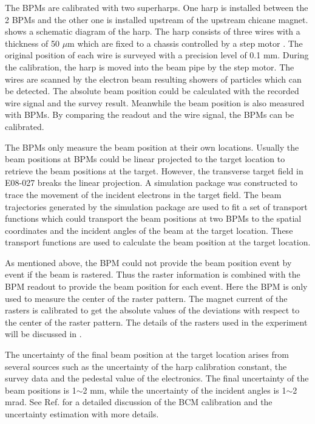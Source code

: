 The BPMs are calibrated with two superharps. One harp is installed between the 2 BPMs and the other one is installed upstream of the upstream chicane magnet.  shows a schematic diagram of the harp. The harp consists of three wires with a thickness of 50 $\mu$m which are fixed to a chassis controlled by a step motor \cite{Yan1995}. The original position of each wire is surveyed with a precision level of 0.1 mm. During the calibration, the harp is moved into the beam pipe by the step motor. The wires are scanned by the electron beam resulting showers of particles which can be detected. The absolute beam position could be calculated with the recorded wire signal and the survey result. Meanwhile the beam position is also measured with BPMs. By comparing the readout and the wire signal, the BPMs can be calibrated.

The BPMs only measure the beam position at their own locations. Usually the beam positions at BPMs could be linear projected to the target location to retrieve the beam positions at the target. However, the transverse target field in E08-027 breaks the linear projection. A simulation package was constructed to trace the movement of the incident electrons in the target field. The beam trajectories generated by the simulation package are used to fit a set of transport functions which could transport the beam positions at two BPMs to the spatial coordinates and the incident angles of the beam at the target location. These transport functions are used to calculate the beam position at the target location.

As mentioned above, the BPM could not provide the beam position event by event if the beam is rastered. Thus the raster information is combined with the BPM readout to provide the beam position for each event. Here the BPM is only used to measure the center of the raster pattern. The magnet current of the rasters is calibrated to get the absolute values of the deviations with respect to the center of the raster pattern. The details of the rasters used in the experiment will be discussed in .

The uncertainty of the final beam position at the target location arises from several sources such as the uncertainty of the harp calibration constant, the survey data and the pedestal value of the electronics. The final uncertainty of the beam positions is 1$\sim$2 mm, while the uncertainty of the incident angles is 1$\sim$2 mrad. See Ref. \cite{Zhu2014} for a detailed discussion of the BCM calibration and the uncertainty estimation with more details.

